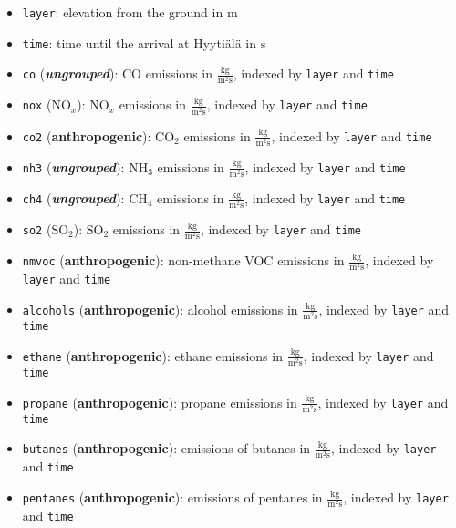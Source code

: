 \begin{itemize}
    \item \texttt{layer}: elevation from the ground in $\text{m}$
    \item \texttt{time}: time until the arrival at Hyyti\"al\"a in $\text{s}$
    \item \texttt{co} (\textit{\textbf{ungrouped}}): $\text{CO}$ emissions in $\frac{\text{kg}}{\text{m}^2 \text{s}}$, indexed by \texttt{layer} and \texttt{time}
    \item \texttt{nox} (\textbf{$\text{NO}_{x}$}): $\text{NO}_{x}$ emissions in $\frac{\text{kg}}{\text{m}^2 \text{s}}$, indexed by \texttt{layer} and \texttt{time}
    \item \texttt{co2} (\textbf{anthropogenic}): $\text{CO}_{2}$ emissions in $\frac{\text{kg}}{\text{m}^2 \text{s}}$, indexed by \texttt{layer} and \texttt{time}
    \item \texttt{nh3} (\textit{\textbf{ungrouped}}): $\text{NH}_{3}$ emissions in $\frac{\text{kg}}{\text{m}^2 \text{s}}$, indexed by \texttt{layer} and \texttt{time}
    \item \texttt{ch4} (\textit{\textbf{ungrouped}}): $\text{CH}_{4}$ emissions in $\frac{\text{kg}}{\text{m}^2 \text{s}}$, indexed by \texttt{layer} and \texttt{time}
    \item \texttt{so2} (\textbf{$\text{SO}_{2}$}): $\text{SO}_{2}$ emissions in $\frac{\text{kg}}{\text{m}^2 \text{s}}$, indexed by \texttt{layer} and \texttt{time}
    \item \texttt{nmvoc} (\textbf{anthropogenic}): non-methane VOC emissions in $\frac{\text{kg}}{\text{m}^2 \text{s}}$, indexed by \texttt{layer} and \texttt{time}
    \item \texttt{alcohols} (\textbf{anthropogenic}): alcohol emissions in $\frac{\text{kg}}{\text{m}^2 \text{s}}$, indexed by \texttt{layer} and \texttt{time}
    \item \texttt{ethane} (\textbf{anthropogenic}): ethane emissions in $\frac{\text{kg}}{\text{m}^2 \text{s}}$, indexed by \texttt{layer} and \texttt{time}
    \item \texttt{propane} (\textbf{anthropogenic}): propane emissions in $\frac{\text{kg}}{\text{m}^2 \text{s}}$, indexed by \texttt{layer} and \texttt{time}
    \item \texttt{butanes} (\textbf{anthropogenic}): emissions of butanes in $\frac{\text{kg}}{\text{m}^2 \text{s}}$, indexed by \texttt{layer} and \texttt{time}
    \item \texttt{pentanes} (\textbf{anthropogenic}): emissions of pentanes in $\frac{\text{kg}}{\text{m}^2 \text{s}}$, indexed by \texttt{layer} and \texttt{time}

\end{itemize}

